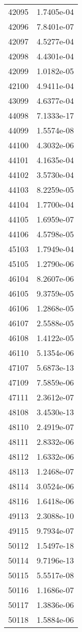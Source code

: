 \begin{table}[h!]
\begin{tabular}{|| c || c |}
42095 & 1.7405e-04 \\
42096 & 7.8401e-07 \\
42097 & 4.5277e-04 \\
42098 & 4.4301e-04 \\
42099 & 1.0182e-05 \\
42100 & 4.9411e-04 \\
43099 & 4.6377e-04 \\
44098 & 7.1333e-17 \\
44099 & 1.5574e-08 \\
44100 & 4.3032e-06 \\
44101 & 4.1635e-04 \\
44102 & 3.5730e-04 \\
44103 & 8.2259e-05 \\
44104 & 1.7700e-04 \\
44105 & 1.6959e-07 \\
44106 & 4.5798e-05 \\
45103 & 1.7949e-04 \\
45105 & 1.2790e-06 \\
46104 & 8.2607e-06 \\
46105 & 9.3759e-05 \\
46106 & 1.2868e-05 \\
46107 & 2.5588e-05 \\
46108 & 1.4122e-05 \\
46110 & 5.1354e-06 \\
47107 & 5.6873e-13 \\ 
47109 & 7.5859e-06 \\
47111 & 2.3612e-07 \\
48108 & 3.4530e-13 \\
48110 & 2.4919e-07 \\ 
48111 & 2.8332e-06 \\
48112 & 1.6332e-06 \\
48113 & 1.2468e-07 \\
48114 & 3.0524e-06 \\
48116 & 1.6418e-06 \\
49113 & 2.3088e-10 \\ 
49115 & 9.7934e-07 \\
50112 & 1.5497e-18 \\
50114 & 9.7196e-13 \\
50115 & 5.5517e-08 \\
50116 & 1.1686e-07 \\
50117 & 1.3836e-06 \\
50118 & 1.5884e-06 \\

\end{tabular}
\end{table}
